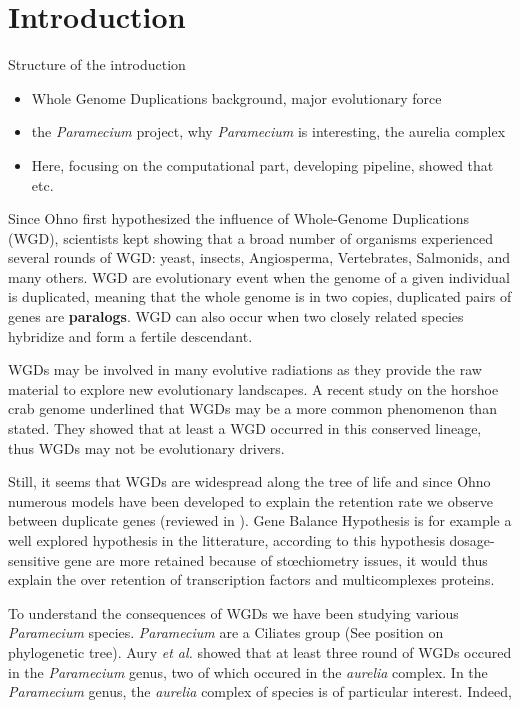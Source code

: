 \section*{Introduction}

Structure of the introduction
\newline
\begin{itemize}
\item Whole Genome Duplications background, major evolutionary force
\item the \textit{Paramecium} project, why \textit{Paramecium} is interesting, the aurelia complex
\item Here, focusing on the computational part, developing pipeline, showed that etc.
\end{itemize}

Since Ohno first hypothesized the influence of Whole-Genome Duplications (WGD), scientists kept showing that a broad number of organisms experienced several rounds of WGD: yeast, insects, Angiosperma, Vertebrates, Salmonids, and many others. WGD are evolutionary event when the genome of a given individual is duplicated, meaning that the whole genome is in two copies, duplicated pairs of genes are \textbf{paralogs}. WGD can also occur when two closely related species hybridize and form a fertile descendant.

WGDs may be involved in many evolutive radiations as they provide the raw material to explore new evolutionary landscapes. A recent study on the horshoe crab genome underlined that WGDs may be a more common phenomenon than stated. They showed that at least a WGD occurred in this conserved lineage, thus WGDs may not be evolutionary drivers.

Still, it seems that WGDs are widespread along the tree of life and since Ohno numerous models have been developed to explain the retention rate we observe between duplicate genes (reviewed in ). Gene Balance Hypothesis is for example a well explored hypothesis in the litterature, according to this hypothesis dosage-sensitive gene are more retained because of stœchiometry issues, it would thus explain the over retention of transcription factors and multicomplexes proteins.

To understand the consequences of WGDs we have been studying various \textit{Paramecium} species. \textit{Paramecium} are a Ciliates group (See position on phylogenetic tree). Aury \textit{et al.} showed that at least three round of WGDs occured in the \textit{Paramecium} genus, two of which occured in the \textit{aurelia} complex.  In the \textit{Paramecium} genus, the \textit{aurelia} complex of species is of particular interest. Indeed, 

